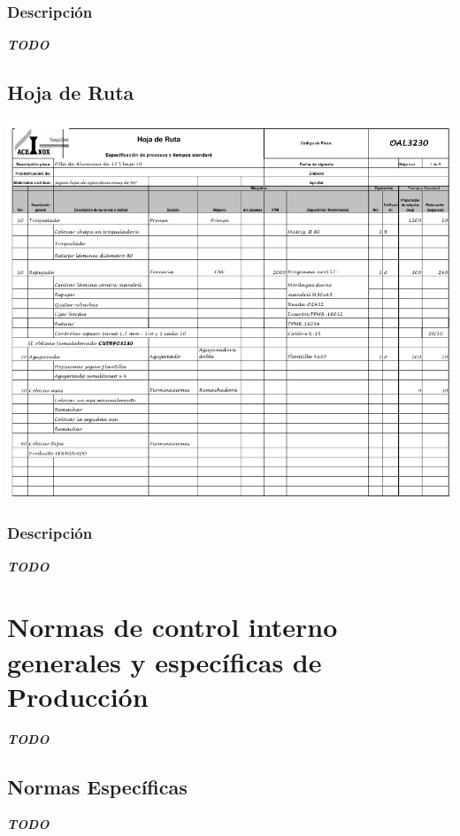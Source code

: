 \subsubsection{Descripción}
\emph{\textbf{TODO}}

\pagebreak
\subsection{Hoja de Ruta}
\begin{center}
 \includegraphics[angle=90,scale=0.95,keepaspectratio=true]{./Circuitos-Teoricos/Produccion/Images/hoja-de-ruta.png}
\end{center}

\subsubsection{Descripción}
\emph{\textbf{TODO}}

\pagebreak
\section{Normas de control interno generales y específicas de Producci\'on}
\emph{\textbf{TODO}}

\subsection{Normas Específicas}
\emph{\textbf{TODO}}

